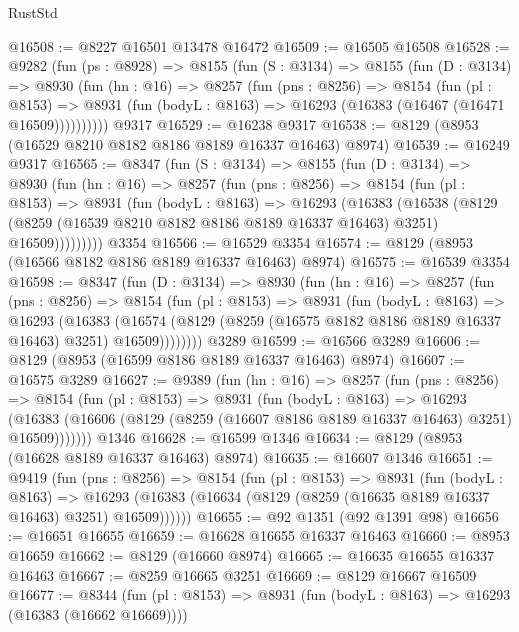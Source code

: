 \begin{lexlean}{RustStd}
\begin{coremodule}
@16508 := @8227 @16501 @13478 @16472
@16509 := @16505 @16508
@16528 := @9282
    (fun (ps : @8928) =>
    @8155
      (fun (S : @3134) =>
      @8155
        (fun (D : @3134) =>
        @8930
          (fun (hn : @16) =>
          @8257
            (fun (pns : @8256) =>
            @8154
              (fun (pl : @8153) =>
              @8931 (fun (bodyL : @8163) => @16293 (@16383 (@16467 (@16471 @16509))))))))))
    @9317
@16529 := @16238 @9317
@16538 := @8129 (@8953 (@16529 @8210 @8182 @8186 @8189 @16337 @16463) @8974)
@16539 := @16249 @9317
@16565 := @8347
    (fun (S : @3134) =>
    @8155
      (fun (D : @3134) =>
      @8930
        (fun (hn : @16) =>
        @8257
          (fun (pns : @8256) =>
          @8154
            (fun (pl : @8153) =>
            @8931
              (fun (bodyL : @8163) =>
              @16293
                (@16383
                  (@16538
                    (@8129
                      (@8259 (@16539 @8210 @8182 @8186 @8189 @16337 @16463) @3251)
                      @16509)))))))))
    @3354
@16566 := @16529 @3354
@16574 := @8129 (@8953 (@16566 @8182 @8186 @8189 @16337 @16463) @8974)
@16575 := @16539 @3354
@16598 := @8347
    (fun (D : @3134) =>
    @8930
      (fun (hn : @16) =>
      @8257
        (fun (pns : @8256) =>
        @8154
          (fun (pl : @8153) =>
          @8931
            (fun (bodyL : @8163) =>
            @16293
              (@16383
                (@16574 (@8129 (@8259 (@16575 @8182 @8186 @8189 @16337 @16463) @3251) @16509))))))))
    @3289
@16599 := @16566 @3289
@16606 := @8129 (@8953 (@16599 @8186 @8189 @16337 @16463) @8974)
@16607 := @16575 @3289
@16627 := @9389
    (fun (hn : @16) =>
    @8257
      (fun (pns : @8256) =>
      @8154
        (fun (pl : @8153) =>
        @8931
          (fun (bodyL : @8163) =>
          @16293
            (@16383 (@16606 (@8129 (@8259 (@16607 @8186 @8189 @16337 @16463) @3251) @16509)))))))
    @1346
@16628 := @16599 @1346
@16634 := @8129 (@8953 (@16628 @8189 @16337 @16463) @8974)
@16635 := @16607 @1346
@16651 := @9419
    (fun (pns : @8256) =>
    @8154
      (fun (pl : @8153) =>
      @8931
        (fun (bodyL : @8163) =>
        @16293 (@16383 (@16634 (@8129 (@8259 (@16635 @8189 @16337 @16463) @3251) @16509))))))
@16655 := @92 @1351 (@92 @1391 @98)
@16656 := @16651 @16655
@16659 := @16628 @16655 @16337 @16463
@16660 := @8953 @16659
@16662 := @8129 (@16660 @8974)
@16665 := @16635 @16655 @16337 @16463
@16667 := @8259 @16665 @3251
@16669 := @8129 @16667 @16509
@16677 := @8344
    (fun (pl : @8153) => @8931 (fun (bodyL : @8163) => @16293 (@16383 (@16662 @16669))))

\end{coremodule}
\end{lexlean}

